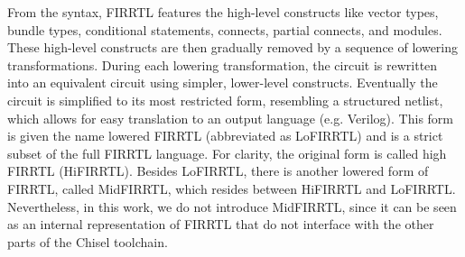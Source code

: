From the syntax, FIRRTL features the high-level constructs like vector types, bundle types, conditional statements, connects, partial connects, and modules.
These high-level constructs are then gradually removed by a sequence of lowering transformations. During each lowering transformation, the circuit is rewritten into an equivalent circuit using simpler, lower-level
constructs. Eventually the circuit is simplified to its most restricted form, resembling a structured netlist, which allows for easy translation to an output language (e.g. Verilog). This form is given the name lowered FIRRTL (abbreviated as LoFIRRTL) and is a strict subset of the full FIRRTL language. For clarity, the original form is called high FIRRTL (HiFIRRTL). Besides LoFIRRTL, there is another lowered form of FIRRTL, called MidFIRRTL, which resides between HiFIRRTL and LoFIRRTL. Nevertheless, in this work, we do not introduce MidFIRRTL, since it can be seen as an internal representation of FIRRTL that do not interface with the other parts of the Chisel toolchain.


